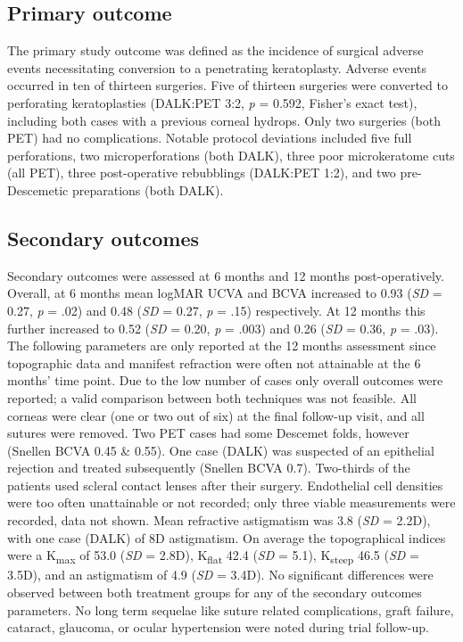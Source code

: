 \documentclass[authordate, empirical,issue]{jote-new-article}
\begin{document}
	\subsection{Primary outcome}



	The primary study outcome was defined as the incidence of surgical adverse events necessitating conversion to a penetrating keratoplasty. Adverse events occurred in ten of thirteen surgeries. Five of thirteen surgeries were converted to perforating keratoplasties (DALK:PET 3:2, \emph{p} = 0.592, Fisher's exact test), including both cases with a previous corneal hydrops. Only two surgeries (both PET) had no complications. Notable protocol deviations included five full perforations, two microperforations (both DALK), three poor microkeratome cuts (all PET), three post-operative rebubblings (DALK:PET 1:2), and two pre-Descemetic preparations (both DALK).



	\subsection{Secondary outcomes}



	Secondary outcomes were assessed at 6 months and 12 months post-operatively. Overall, at 6 months mean logMAR UCVA and BCVA increased to 0.93 (\emph{SD }=\emph{ }0.27, \emph{p }= .02) and 0.48 (\emph{SD }=\emph{ }0.27, \emph{p} = .15) respectively. At 12 months this further increased to 0.52 (\emph{SD }=\emph{ }0.20, \emph{p }= .003) and 0.26 (\emph{SD }=\emph{ }0.36, \emph{p }= .03). The following parameters are only reported at the 12 months assessment since topographic data and manifest refraction were often not attainable at the 6 months' time point. Due to the low number of cases only overall outcomes were reported; a valid comparison between both techniques was not feasible. All corneas were clear (one or two out of six) at the final follow-up visit, and all sutures were removed. Two PET cases had some Descemet folds, however (Snellen BCVA 0.45 \& 0.55). One case (DALK) was suspected of an epithelial rejection and treated subsequently (Snellen BCVA 0.7). Two-thirds of the patients used scleral contact lenses after their surgery. Endothelial cell densities were too often unattainable or not recorded; only three viable measurements were recorded, data not shown. Mean refractive astigmatism was 3.8 (\emph{SD }=\emph{ }2.2D), with one case (DALK) of 8D astigmatism. On average the topographical indices were a K\textsubscript{max} of 53.0 (\emph{SD }=\emph{ }2.8D), K\textsubscript{flat} 42.4 (\emph{SD }= 5.1), K\textsubscript{steep }46.5 (\emph{SD }= 3.5D), and an astigmatism of 4.9 (\emph{SD }= 3.4D). No significant differences were observed between both treatment groups for any of the secondary outcomes parameters. No long term sequelae like suture related complications, graft failure, cataract, glaucoma, or ocular hypertension were noted during trial follow-up.
\end{document}
